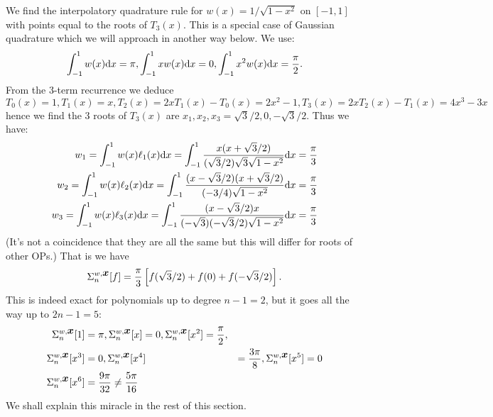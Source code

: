 \begin{example} We  find the interpolatory quadrature rule for $w(x) = 1/\sqrt{1-x^2}$ on $[-1,1]$ with points equal to the roots of $T_3(x)$.  This is a special case of Gaussian quadrature which we will approach in another way below. We use:
\[
\int_{-1}^1 w(x) {\rm d}x = \ensuremath{\pi}, \int_{-1}^1 xw(x) {\rm d}x = 0, \int_{-1}^1 x^2 w(x) {\rm d}x = {\ensuremath{\pi} \over 2}.
\]
From the 3-term recurrence we deduce
\[
T_0(x) = 1, T_1(x) =x, T_2(x) = 2x T_1(x) - T_0(x) = 2x^2-1, T_3(x) = 2x T_2(x) - T_1(x) = 4x^3-3x
\]
hence we find the 3 roots of $T_3(x)$ are $x_1,x_2,x_3 = \sqrt{3}/2,0,-\sqrt{3}/2$. Thus we have:
\begin{align*}
w_1 = \int_{-1}^1 w(x) \ensuremath{\ell}_1(x) {\rm d}x = \int_{-1}^1 {x(x+\sqrt{3}/2) \over (\sqrt{3}/2) \sqrt{3} \sqrt{1-x^2}}{\rm d}x = {\ensuremath{\pi} \over 3} \\
w_2 = \int_{-1}^1 w(x) \ensuremath{\ell}_2(x) {\rm d}x = \int_{-1}^1 {(x-\sqrt{3}/2)(x+\sqrt{3}/2) \over (-3/4)\sqrt{1-x^2}}{\rm d}x = {\ensuremath{\pi} \over 3} \\
w_3 = \int_{-1}^1 w(x) \ensuremath{\ell}_3(x) {\rm d}x = \int_{-1}^1 {(x-\sqrt{3}/2) x \over (-\sqrt{3})(-\sqrt{3}/2) \sqrt{1-x^2}}{\rm d}x = {\ensuremath{\pi} \over 3}
\end{align*}
(It's not a coincidence that they are all the same but this will differ for roots of other OPs.)  That is we have
\[
\ensuremath{\Sigma}_n^{w,\ensuremath{\bm{\x}}}[f]  = {\ensuremath{\pi} \over 3}\br[ f(\sqrt{3}/2) + f(0) + f(-\sqrt{3}/2) ].
\]
This is indeed exact for polynomials up to degree $n-1=2$, but it goes all the way up to $2n-1 = 5$:
\begin{align*}
\Sigma_n^{w,\bm{{\mbox{\boldmath$x$\unboldmath}}}}[1] &= \pi, \Sigma_n^{w,\bm{{\mbox{\boldmath$x$\unboldmath}}}}[x] = 0, \Sigma_n^{w,\bm{{\mbox{\boldmath$x$\unboldmath}}}}[x^2] = {\pi \over 2}, \\
\Sigma_n^{w,\bm{{\mbox{\boldmath$x$\unboldmath}}}}[x^3] &= 0, \Sigma_n^{w,\bm{{\mbox{\boldmath$x$\unboldmath}}}}[x^4] &= {3 \pi \over 8}, \Sigma_n^{w,\bm{{\mbox{\boldmath$x$\unboldmath}}}}[x^5] = 0 \\
\Sigma_n^{w,\bm{{\mbox{\boldmath$x$\unboldmath}}}}[x^6] &= {9 \pi \over 32} \neq {5 \ensuremath{\pi} \over 16}
\end{align*}
We shall explain this miracle in the rest of this section. \end{example}

